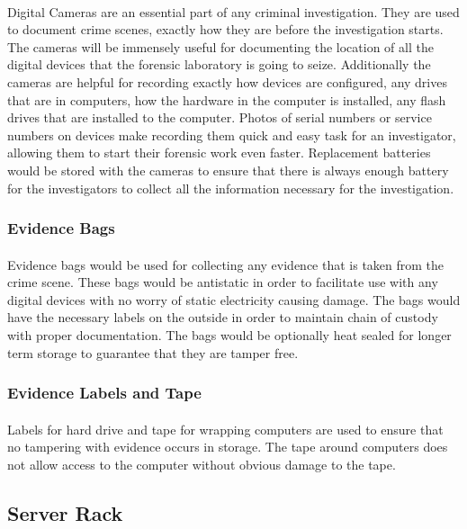 \documentclass{article}
\begin{document}
\paragraph{}
Digital Cameras are an essential part of any criminal investigation.
They are used to document crime scenes, exactly how they are before the investigation starts. 
The cameras will be immensely useful for documenting the location of all the digital devices that the forensic laboratory is going to seize. 
Additionally the cameras are helpful for recording exactly how devices are configured, any drives that are in computers, how the hardware in the computer is installed, any flash drives that are installed to the computer.
Photos of serial numbers or service numbers on devices make recording them quick and easy task for an investigator, allowing them to start their forensic work even faster. 
Replacement batteries would be stored with the cameras to ensure that there is always enough battery for the investigators to collect all the information necessary for the investigation.
\subsubsection{Evidence Bags}
\paragraph{}
Evidence bags would be used for collecting any evidence that is taken from the crime scene.
These bags would be antistatic in order to facilitate use with any digital devices with no worry of static electricity causing damage. 
The bags would have the necessary labels on the outside in order to maintain chain of custody with proper documentation. 
The bags would be optionally heat sealed for longer term storage to guarantee that they are tamper free. 
\subsubsection{Evidence Labels and Tape}
\paragraph{}
Labels for hard drive and tape for wrapping computers are used to ensure that no tampering with evidence occurs in storage. 
The tape around computers does not allow access to the computer without obvious damage to the tape. 

\subsection{Server Rack}
\end{document}
